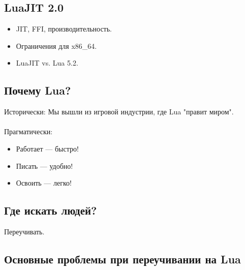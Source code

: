 \documentclass[aspectratio=169,handout,bigger]{beamer}
\begin{document}

\subsection*{LuaJIT 2.0}

\begin{frame}
  \begin{itemize}
    \item JIT, FFI, производительность.
    \item Ограничения для x86\_64.
    \item LuaJIT vs. Lua 5.2.
  \end{itemize}
\end{frame}


\subsection*{Почему Lua?}

\begin{frame}
  Исторически: Мы вышли из игровой индустрии, где Lua "правит миром".
  \\~\\
  Прагматически:
  \begin{itemize}
    \item Работает — быстро!
    \item Писать — удобно!
    \item Освоить — легко!
  \end{itemize}
\end{frame}


\subsection*{Где искать людей?}

\begin{frame}
  \begin{center}
    Переучивать.
  \end{center}
\end{frame}


\subsection*{Основные проблемы при переучивании на Lua}
\end{document}
